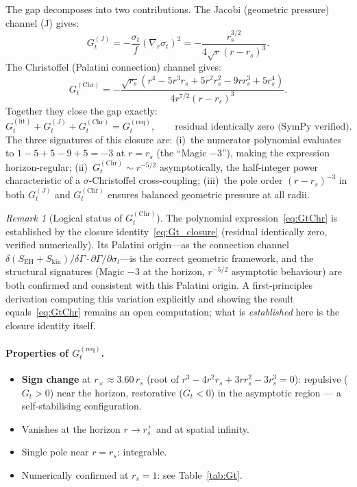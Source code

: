 \documentclass[11pt,a4paper]{article}
\theoremstyle{plain}
\theoremstyle{definition}
\theoremstyle{remark}
\newtheorem{remark}[theorem]{Remark}
\newcommand{\sigt}{\sigma_t}
\newcommand{\rs}{r_s}
\newcommand{\Skin}{S_{\mathrm{kin}}}
\begin{document}
The gap decomposes into two contributions.  The Jacobi (geometric pressure) channel (J)
gives:
\begin{equation}
  G_t^{(J)} = -\frac{\sigt}{f}(\nabla_r\sigt)^2
  = -\frac{\rs^{3/2}}{4\sqrt{r}(r-\rs)^3}.
  \label{eq:GtJ}
\end{equation}
The Christoffel (Palatini connection) channel gives:
\begin{equation}
  G_t^{(\mathrm{Chr})} = -\frac{\sqrt{\rs}(r^4-5r^3\rs+5r^2\rs^2-9r\rs^3+5\rs^4)}
                               {4r^{7/2}(r-\rs)^3}.
  \label{eq:GtChr}
\end{equation}
Together they close the gap exactly:
\begin{equation}
  G_t^{(\mathrm{lit})} + G_t^{(J)} + G_t^{(\mathrm{Chr})} = G_t^{(\mathrm{req})},
  \qquad \text{residual identically zero (SymPy verified).}
  \label{eq:Gt_closure}
\end{equation}
The three signatures of this closure are: (i)~the numerator polynomial evaluates to
$1-5+5-9+5=-3$ at $r=\rs$ (the ``Magic $-3$''), making the expression horizon-regular;
(ii)~$G_t^{(\mathrm{Chr})} \sim r^{-5/2}$ asymptotically, the half-integer power
characteristic of a $\sigma$-Christoffel cross-coupling; (iii)~the pole order
$(r-\rs)^{-3}$ in both $G_t^{(J)}$ and $G_t^{(\mathrm{Chr})}$ ensures balanced
geometric pressure at all radii.

\begin{remark}[Logical status of $G_t^{(\mathrm{Chr})}$]
\label{rem:GtChr_status}
The polynomial expression~\eqref{eq:GtChr} is established by the closure
identity~\eqref{eq:Gt_closure} (residual identically zero, verified numerically).
Its Palatini origin---as the connection channel
$\delta(S_{\mathrm{EH}}+\Skin)/\delta\Gamma\cdot\partial\Gamma/\partial\sigt$---is
the correct geometric framework, and the structural signatures (Magic $-3$ at the
horizon, $r^{-5/2}$ asymptotic behaviour) are both confirmed and consistent with
this Palatini origin.  A first-principles derivation computing this variation
explicitly and showing the result equals~\eqref{eq:GtChr} remains an open
computation; what is \emph{established} here is the closure identity itself.
\end{remark}

\paragraph{Properties of $G_t^{(\mathrm{req})}$.}
\begin{itemize}[nosep]
  \item \textbf{Sign change} at $r_\times \approx 3.60\,\rs$
    (root of $r^3 - 4r^2\rs + 3r\rs^2 - 3\rs^3 = 0$):
    repulsive ($G_t > 0$) near the horizon, restorative ($G_t < 0$) in the
    asymptotic region --- a self-stabilising configuration.
  \item Vanishes at the horizon $r \to \rs^+$ and at spatial infinity.
  \item Single pole near $r = \rs$: integrable.
  \item Numerically confirmed at $\rs = 1$: see Table~\ref{tab:Gt}.
\end{itemize}
\end{document}
